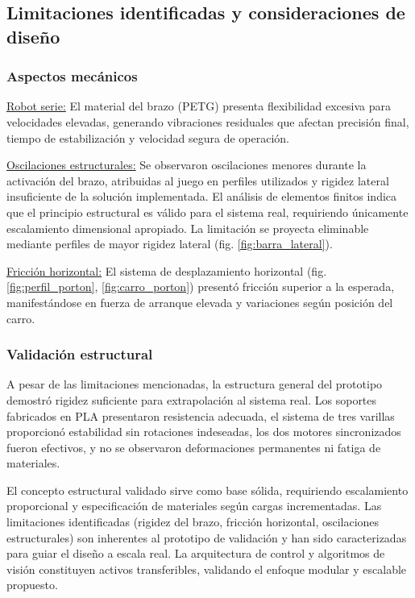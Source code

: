 \subsection{Limitaciones identificadas y consideraciones de diseño}

\subsubsection{Aspectos mecánicos}

\underline{Robot serie:} El material del brazo (PETG) presenta flexibilidad excesiva para velocidades elevadas, generando vibraciones residuales que afectan precisión final, tiempo de estabilización y velocidad segura de operación.

\underline{Oscilaciones estructurales:} Se observaron oscilaciones menores durante la activación del brazo, atribuidas al juego en perfiles utilizados y rigidez lateral insuficiente de la solución implementada. El análisis de elementos finitos indica que el principio estructural es válido para el sistema real, requiriendo únicamente escalamiento dimensional apropiado. La limitación se proyecta eliminable mediante perfiles de mayor rigidez lateral (fig. \ref{fig:barra_lateral}).

\underline{Fricción horizontal:} El sistema de desplazamiento horizontal (fig. \ref{fig:perfil_porton}, \ref{fig:carro_porton}) presentó fricción superior a la esperada, manifestándose en fuerza de arranque elevada y variaciones según posición del carro.

\subsubsection{Validación estructural}

A pesar de las limitaciones mencionadas, la estructura general del prototipo demostró rigidez suficiente para extrapolación al sistema real. Los soportes fabricados en PLA presentaron resistencia adecuada, el sistema de tres varillas proporcionó estabilidad sin rotaciones indeseadas, los dos motores sincronizados fueron efectivos, y no se observaron deformaciones permanentes ni fatiga de materiales.

El concepto estructural validado sirve como base sólida, requiriendo escalamiento proporcional y especificación de materiales según cargas incrementadas. Las limitaciones identificadas (rigidez del brazo, fricción horizontal, oscilaciones estructurales) son inherentes al prototipo de validación y han sido caracterizadas para guiar el diseño a escala real. La arquitectura de control y algoritmos de visión constituyen activos transferibles, validando el enfoque modular y escalable propuesto.
